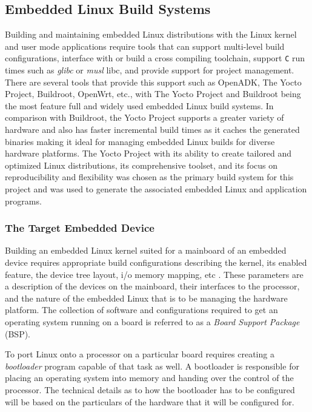 \subsection{Embedded Linux Build Systems}

Building and maintaining embedded Linux distributions with the Linux kernel and user mode applications require tools that can support multi-level build configurations, interface with or build a cross compiling toolchain, support \texttt{C} run times such as \textit{glibc} or \textit{musl} libc, and provide support for project management. There are several tools that provide this support such as OpenADK, The Yocto Project, Buildroot, OpenWrt, etc., with The Yocto Project and Buildroot being the most feature full and widely used embedded Linux build systems. In comparison with Buildroot, the Yocto Project supports a greater variety of hardware and also has faster incremental build times as it caches the generated binaries \cite{yocto} making it ideal for managing embedded Linux builds for diverse hardware platforms. The Yocto Project with its ability to create tailored and optimized Linux distributions, its comprehensive toolset, and its focus on reproducibility and flexibility was chosen as the primary build system for this project and was used to generate the associated embedded Linux and application programs.

\subsubsection{The Target Embedded Device}

Building an embedded Linux kernel suited for a mainboard of an embedded device requires appropriate build configurations describing the kernel, its enabled feature, the device tree layout, i/o memory mapping, etc \cite{bootlin-port}. These parameters are a description of the devices on the mainboard, their interfaces to the processor, and the nature of the embedded Linux that is to be managing the hardware platform. The collection of software and configurations required to get an operating system running on a board is referred to as a \textit{Board Support Package} (BSP).

To port Linux onto a processor on a particular board requires creating a \textit{bootloader} program capable of that task as well. A bootloader is responsible for placing an operating system into memory and handing over the control of the processor. The technical details as to how the bootloader has to be configured will be based on the particulars of the hardware that it will be configured for.

